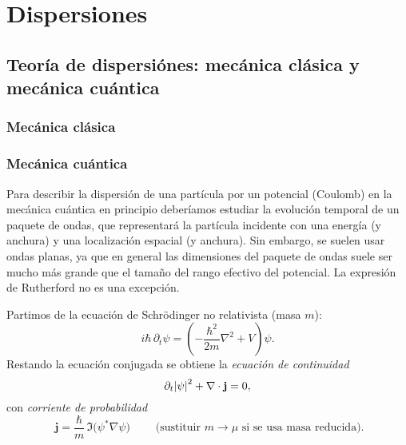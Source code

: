 \chapter{Dispersiones}

\section{Teoría de dispersiónes: mecánica clásica y  mecánica cuántica}

\subsection{Mecánica clásica}


\subsection{Mecánica cuántica}

Para describir la dispersión de una partícula por un potencial (Coulomb) en la mecánica cuántica en principio deberíamos estudiar la evolución temporal de un paquete de ondas, que representará la partícula incidente con una energía (y anchura) y una localización espacial (y anchura). Sin embargo, se suelen usar ondas planas, ya que en general las dimensiones del paquete de ondas suele ser mucho más grande que el tamaño del rango efectivo del potencial. La expresión de Rutherford no es una excepción.  




Partimos de la ecuación de Schrödinger no relativista (masa $m$):
\begin{equation}
i\hbar\,\partial_t\psi=\left(-\frac{\hbar^2}{2m}\nabla^2+V\right)\psi.
\end{equation}
Restando la ecuación conjugada se obtiene la \emph{ecuación de continuidad}
\begin{equation}
\partial_t \abs{\psi}^2 + \nabla\cdot\mathbf{j}=0,
\end{equation}
con \emph{corriente de probabilidad}
\begin{equation}
{\;\mathbf{j}=\frac{\hbar}{m}\,\Im\!\big(\psi^{*}\nabla\psi\big)\;}
\qquad \text{(sustituir $m\to \mu$ si se usa masa reducida).}
\end{equation}

